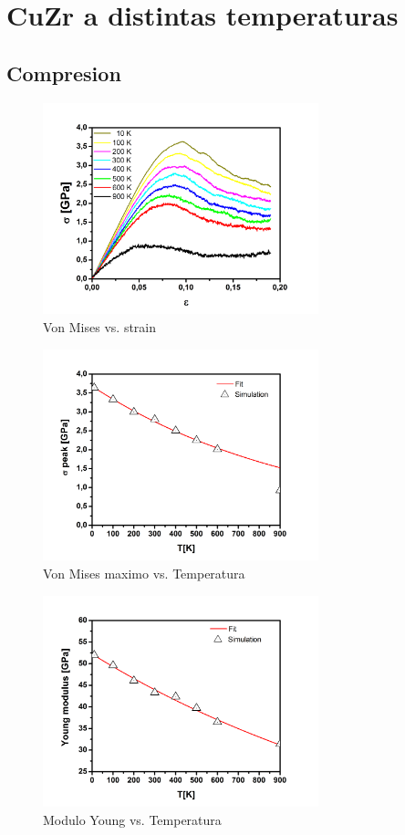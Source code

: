 \documentclass[10pt, oneside]{article} %
\begin{document}
 
\section{CuZr a distintas temperaturas}

\subsection{Compresion}

\begin{figure}[H]
\centering
\includegraphics[width=8cm]{stress_strain_COMP.png}
\caption{Von Mises vs. strain}
\end{figure}

\begin{figure}[H]
\centering
\includegraphics[width=8cm]{peakstress_T_COMP.png}
\caption{Von Mises maximo vs. Temperatura}
\end{figure}

\begin{figure}[H]
\centering
\includegraphics[width=8cm]{young_T_COMP.png}
\caption{Modulo Young vs. Temperatura}
\end{figure}
\end{document}
